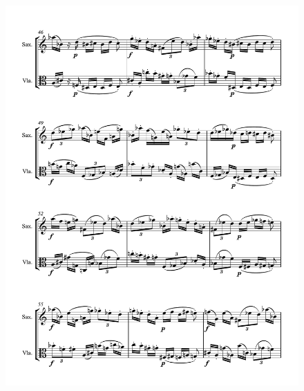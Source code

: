 \begin{figure}[htbp]
    \centering
	\includegraphics[width=6.5in]{figures/Sax_Viola_5.pdf}
\end{figure}

